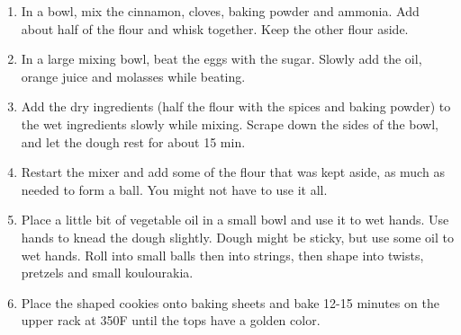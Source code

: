 \begin{enumerate}
    \item In a bowl, mix the cinnamon, cloves, baking powder and ammonia. Add about half of the flour and whisk together. Keep the other flour aside.
    \item In a large mixing bowl, beat the eggs with the sugar. Slowly add the oil, orange juice and molasses while beating.
    \item Add the dry ingredients (half the flour with the spices and baking powder) to the wet ingredients slowly while mixing. Scrape down the sides of the bowl, and let the dough rest for about 15 min.
    \item Restart the mixer and add some of the flour that was kept aside, as much as needed to form a ball. You might not have to use it all.
    \item Place a little bit of vegetable oil in a small bowl and use it to wet hands. Use hands to knead the dough slightly. Dough might be sticky, but use some oil to wet hands. Roll into small balls then into strings, then shape into twists, pretzels and small koulourakia.
    \item Place the shaped cookies onto baking sheets and bake 12-15 minutes on the upper rack at 350\degree F until the tops have a golden color.
\end{enumerate}
